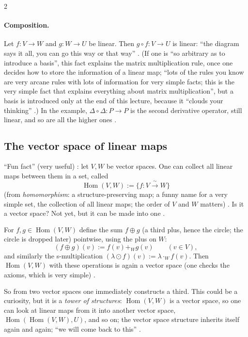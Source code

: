 \begin{paracol}{2}
\paragraph{Composition.} Let $f\colon V\to W$ and $g\colon W\to U$ be linear. Then $g\circ f\colon V\to U$ is linear: ``the diagram says it all, you can go this way or that way'' .
(If one is ``so arbitrary as to introduce a basis'', this fact explains the matrix multiplication rule, once one decides how to store the information of a linear map; ``lots of the rules you know are very arcane rules with lots of information for very simple facts; this is the very simple fact
that explains everything about matrix multiplication'', but a basis is introduced only at the end of this lecture, because it ``clouds your thinking'' .)
In the example, $\Delta\circ\Delta\colon P\to P$ is the second derivative operator, still linear, and so are all the higher ones .

\subsection{The vector space of linear maps}

``Fun fact'' (very useful) : let $V,W$ be vector spaces. One can collect all linear maps between them in a set, called
\[
  \operatorname{Hom}(V,W):=\{f\colon V\xrightarrow{\ \sim\ }W\}
\]
(from \emph{homomorphism}: a structure-preserving map; a funny name for a very simple set, the collection of all linear maps; the order of $V$ and $W$ matters) .
Is it a vector space? Not yet, but it can be made into one .

\begin{definition}\label{def:c03-hom}
For $f,g\in\operatorname{Hom}(V,W)$ define the sum $f\oplus g$ (a third plus, hence the circle; the circle is dropped later) pointwise, using the plus on $W$:
\[
  (f\oplus g)(v):=f(v)+_Wg(v)\qquad(v\in V),
\]
and similarly the s-multiplication $(\lambda\odot f)(v):=\lambda\cdot_Wf(v)$. Then $\operatorname{Hom}(V,W)$ with these operations is again a vector space (one checks the axioms, which is very simple)
.
\end{definition}
So from two vector spaces one immediately constructs a third. This could be a curiosity, but it is a \emph{tower of structures}: $\operatorname{Hom}(V,W)$ is a vector space, so one can look at linear maps from it into another vector space,
$\operatorname{Hom}(\operatorname{Hom}(V,W),U)$, and so on; the vector space structure inherits itself again and again; ``we will come back to this'' .


\end{paracol}
